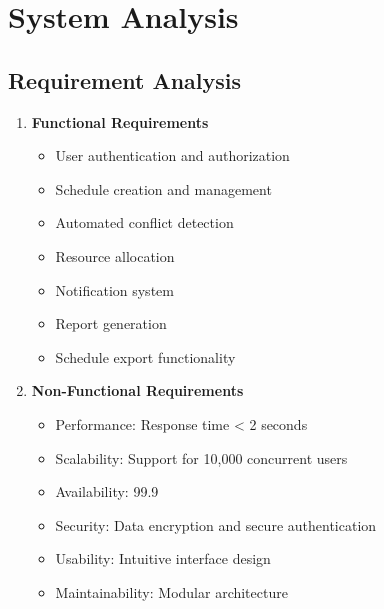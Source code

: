 \documentclass[12pt,a4paper]{report}
\begin{document}
\section{System Analysis}
\subsection{Requirement Analysis}
\begin{enumerate}
    \item \textbf{Functional Requirements}
    \begin{itemize}
        \item User authentication and authorization
        \item Schedule creation and management
        \item Automated conflict detection
        \item Resource allocation
        \item Notification system
        \item Report generation
        \item Schedule export functionality
    \end{itemize}
    
    \item \textbf{Non-Functional Requirements}
    \begin{itemize}
        \item Performance: Response time < 2 seconds
        \item Scalability: Support for 10,000 concurrent users
        \item Availability: 99.9%
        \item Security: Data encryption and secure authentication
        \item Usability: Intuitive interface design
        \item Maintainability: Modular architecture
    \end{itemize}
\end{enumerate}
\end{document}
